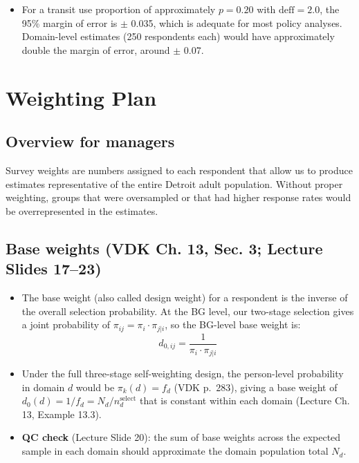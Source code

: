 \documentclass[
  11pt,
]{article}
\providecommand{\tightlist}{%
  \setlength{\itemsep}{0pt}\setlength{\parskip}{0pt}}\usepackage{longtable,booktabs,array}
\begin{document}
\begin{itemize}
\tightlist
\item
  For a transit use proportion of approximately \(p = 0.20\) with
  \(\text{deff} = 2.0\), the 95\% margin of error is \(\pm\) 0.035,
  which is adequate for most policy analyses. Domain-level estimates
  (250 respondents each) would have approximately double the margin of
  error, around \(\pm\) 0.07.
\end{itemize}

\section{Weighting Plan}\label{sec-weighting}

\subsection{Overview for managers}\label{overview-for-managers}

Survey weights are numbers assigned to each respondent that allow us to
produce estimates representative of the entire Detroit adult population.
Without proper weighting, groups that were oversampled or that had
higher response rates would be overrepresented in the estimates.

\subsection{Base weights (VDK Ch. 13, Sec. 3; Lecture Slides
17--23)}\label{base-weights-vdk-ch.-13-sec.-3-lecture-slides-1723}

\begin{itemize}
\item
  The base weight (also called design weight) for a respondent is the
  inverse of the overall selection probability. At the BG level, our
  two-stage selection gives a joint probability of
  \(\pi_{ij} = \pi_i \cdot \pi_{j|i}\), so the BG-level base weight is:
  \[d_{0,ij} = \frac{1}{\pi_i \cdot \pi_{j|i}}\]
\item
  Under the full three-stage self-weighting design, the person-level
  probability in domain \(d\) would be \(\pi_k(d) = f_d\) (VDK p.~283),
  giving a base weight of \(d_0(d) = 1/f_d = N_d / n_d^{\text{select}}\)
  that is constant within each domain (Lecture Ch. 13, Example 13.3).
\item
  \textbf{QC check} (Lecture Slide 20): the sum of base weights across
  the expected sample in each domain should approximate the domain
  population total \(N_d\).
\end{itemize}
\end{document}
